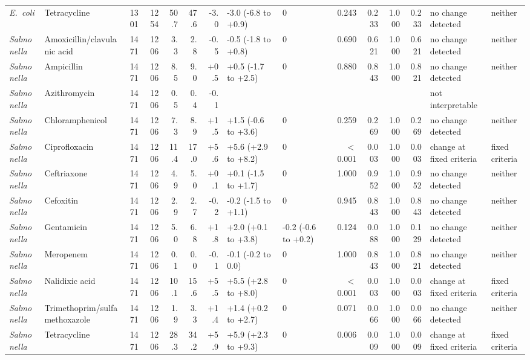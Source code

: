 \begin{table}[h]
\begin{tabular}{llrrrrrllrrrrll}
\textit{E.~coli} & Tetracycline & 1301 & 1254 & 50.7 & 47.6 & -3.0 & -3.0 (-6.8 to +0.9) & 0 & 0.243 & 0.233 & 1.000 & 0.233 & no change detected & neither \\
\textit{Salmonella} & Amoxicillin/clavulanic acid & 1471 & 1206 & 3.3 & 2.8 & -0.5 & -0.5 (-1.8 to +0.8) & 0 & 0.690 & 0.621 & 1.000 & 0.621 & no change detected & neither \\
\textit{Salmonella} & Ampicillin & 1471 & 1206 & 8.5 & 9.0 & +0.5 & +0.5 (-1.7 to +2.5) & 0 & 0.880 & 0.843 & 1.000 & 0.821 & no change detected & neither \\
\textit{Salmonella} & Azithromycin & 1471 & 1206 & 0.5 & 0.4 & -0.1 &  &  &  &  &  &  & not interpretable &  \\
\textit{Salmonella} & Chloramphenicol & 1471 & 1206 & 7.3 & 8.9 & +1.5 & +1.5 (-0.6 to +3.6) & 0 & 0.259 & 0.269 & 1.000 & 0.269 & no change detected & neither \\
\textit{Salmonella} & Ciprofloxacin & 1471 & 1206 & 11.4 & 17.0 & +5.6 & +5.6 (+2.9 to +8.2) & 0 & $<$0.001 & 0.003 & 1.000 & 0.003 & change at fixed criteria & fixed criteria \\
\textit{Salmonella} & Ceftriaxone & 1471 & 1206 & 4.9 & 5.0 & +0.1 & +0.1 (-1.5 to +1.7) & 0 & 1.000 & 0.952 & 1.000 & 0.952 & no change detected & neither \\
\textit{Salmonella} & Cefoxitin & 1471 & 1206 & 2.9 & 2.7 & -0.2 & -0.2 (-1.5 to +1.1) & 0 & 0.945 & 0.843 & 1.000 & 0.843 & no change detected & neither \\
\textit{Salmonella} & Gentamicin & 1471 & 1206 & 5.0 & 6.8 & +1.8 & +2.0 (+0.1 to +3.8) & -0.2 (-0.6 to +0.2) & 0.124 & 0.088 & 1.000 & 0.129 & no change detected & neither \\
\textit{Salmonella} & Meropenem & 1471 & 1206 & 0.1 & 0.0 & -0.1 & -0.1 (-0.2 to 0.0) & 0 & 1.000 & 0.843 & 1.000 & 0.821 & no change detected & neither \\
\textit{Salmonella} & Nalidixic acid & 1471 & 1206 & 10.1 & 15.6 & +5.5 & +5.5 (+2.8 to +8.0) & 0 & $<$0.001 & 0.003 & 1.000 & 0.003 & change at fixed criteria & fixed criteria \\
\textit{Salmonella} & Trimethoprim/sulfamethoxazole & 1471 & 1206 & 1.9 & 3.3 & +1.4 & +1.4 (+0.2 to +2.7) & 0 & 0.071 & 0.066 & 1.000 & 0.066 & no change detected & neither \\
\textit{Salmonella} & Tetracycline & 1471 & 1206 & 28.3 & 34.2 & +5.9 & +5.9 (+2.3 to +9.3) & 0 & 0.006 & 0.009 & 1.000 & 0.009 & change at fixed criteria & fixed criteria \\

\end{tabular}
\end{table}
